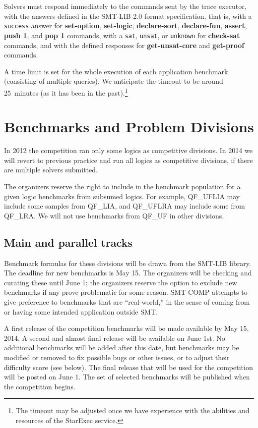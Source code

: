 \documentclass[12pt]{article}
\newcommand{\akey}[1]{\textbf{#1}}
\begin{document}
\medskip
Solvers must respond immediately to the commands sent by the trace executor, 
with the answers defined in the SMT-LIB 2.0 format specification, that is,
with a \texttt{success} answer for 
\akey{set-option}, 
\akey{set-logic}, 
\akey{declare-sort}, 
\akey{declare-fun}, 
\akey{assert}, 
\akey{push 1}, 
and \akey{pop 1} 
commands,
 with a \texttt{sat}, \texttt{unsat}, or \texttt{unknown} 
for \akey{check-sat} commands, and with the defined responses for \akey{get-unsat-core} and \akey{get-proof} commands.

A time limit is set for the whole execution of each application
benchmark (consisting of multiple queries).  We anticipate the
timeout to be around 25~minutes (as it has been in the past).\footnote{The timeout may be adjusted once we have experience with the abilities and resources of the StarExec service.}



\section{Benchmarks and Problem Divisions}
\label{sec:theories}

In 2012 the competition ran only some logics as competitive divisions.
In 2014 we will revert to previous practice and run all logics as competitive divisions, if there are multiple solvers submitted.

The organizers reserve the right to include in the benchmark population for a given logic benchmarks
from subsumed logics. For example, QF\_UFLIA may include some samples from QF\_LIA, and QF\_UFLRA may include some from QF\_LRA.
We will not use benchmarks from QF\_UF in other divisions.

\subsection{Main and parallel tracks}

Benchmark formulas for these divisions
will be drawn from the SMT-LIB library. The deadline for new benchmarks is
May 15. The organizers will be checking and curating these until June 1;
the organizers reserve the option to exclude new benchmarks if any prove problematic for some reason.
SMT-COMP
attempts to give preference to benchmarks that are ``real-world,'' in
the sense of coming from or having some intended application outside
SMT.

A first release of the competition
benchmarks will be made available by May 15, 2014.
A second and almost final release will be available on June 1st. 
No additional
benchmarks will be added after this date, but benchmarks may be
modified or removed to fix possible bugs or other issues, or to adjust their difficulty score (see below). 
The final release that will be used for the competition will be posted on June
1. The set of selected benchmarks will be published when the
competition begins.
\end{document}
